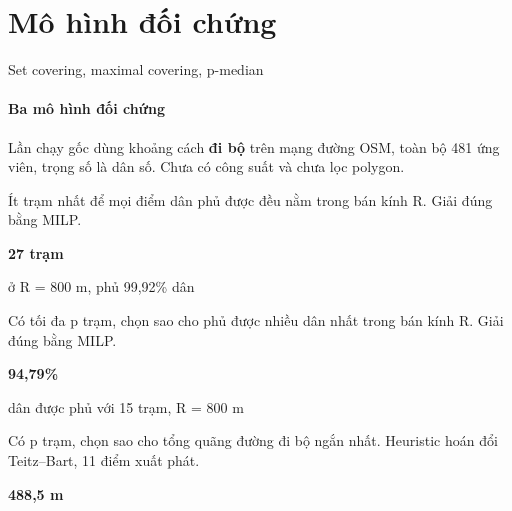 \documentclass[aspectratio=169, 10pt, t, xcolor=table]{beamer}
\newcommand{\Flead}{\fontsize{8}{11}\selectfont}
\newcommand{\Fsmall}{\fontsize{6.2}{8}\selectfont}
\newcommand{\code}[1]{{\ttfamily #1}}
\newcommand{\slidefoot}{}
\newcommand{\sfoot}[1]{\gdef\slidefoot{#1}}
\begin{document}
\section{Mô hình đối chứng}
\sfoot{Lần chạy đi bộ, 481 ứng viên · Nguồn: \code{results\_walking\_all.csv}, 69 lời giải}
\begin{frame}{Set covering, maximal covering, p-median}
  \framesubtitle{Ba mô hình đối chứng}
  {\Flead\color{soft}Lần chạy gốc dùng khoảng cách \textbf{đi bộ} trên mạng đường OSM, toàn bộ 481 ứng viên,
    trọng số là dân số. Chưa có công suất và chưa lọc polygon.\par}
  \vspace{2.0mm}
  \begin{tcbraster}[raster columns=3]
    \begin{card}[top=2.4mm, bottom=2.4mm, left=2.4mm, right=2.4mm, title={Set covering}]\begin{minipage}[t][23mm][t]{\linewidth}\raggedright
      Ít trạm nhất để mọi điểm dân phủ được đều nằm trong bán kính R. Giải đúng bằng MILP.
      \vfill
      {\fontsize{15}{17}\selectfont\bfseries\color{accent}27 trạm\par}\vspace{0.5mm}
      {\Fsmall ở R = 800 m, phủ 99,92\% dân}
    \end{minipage}\end{card}
    \begin{card}[top=2.4mm, bottom=2.4mm, left=2.4mm, right=2.4mm, title={Maximal covering}]\begin{minipage}[t][23mm][t]{\linewidth}\raggedright
      Có tối đa p trạm, chọn sao cho phủ được nhiều dân nhất trong bán kính R. Giải đúng bằng MILP.
      \vfill
      {\fontsize{15}{17}\selectfont\bfseries\color{accent}94,79\%\par}\vspace{0.5mm}
      {\fontsize{6}{8}\selectfont dân được phủ với 15 trạm, R = 800 m}
    \end{minipage}\end{card}
    \begin{card}[top=2.4mm, bottom=2.4mm, left=2.4mm, right=2.4mm, title={p-median}]\begin{minipage}[t][23mm][t]{\linewidth}\raggedright
      Có p trạm, chọn sao cho tổng quãng đường đi bộ ngắn nhất. Heuristic hoán đổi Teitz–Bart,
      11 điểm xuất phát.
      \vfill
      {\fontsize{15}{17}\selectfont\bfseries\color{accent}488,5 m\par}\vspace{0.5mm}

\end{minipage}
\end{card}
\end{tcbraster}
\end{frame}
\end{document}
